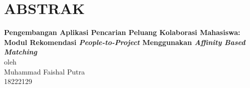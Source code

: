 \chapter*{ABSTRAK}

\begin{center}

    \textbf{Pengembangan Aplikasi Pencarian Peluang Kolaborasi Mahasiswa: Modul Rekomendasi \emph{People-to-Project} Menggunakan \emph{Affinity Based Matching}} \\
    \vspace{0.4cm}
    oleh \\
    \vspace{0.4cm}
    Muhammad Faishal Putra\\
    18222129\\
\end{center}


